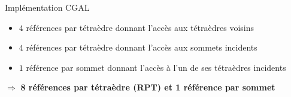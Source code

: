 \documentclass[9pt]{beamer}
\begin{document}
\begin{frame}
\begin{block}{Implémentation CGAL}
\begin{itemize}
\item $4$ références par tétraèdre donnant l'accès aux tétraèdres voisins
\item $4$ références par tétraèdre donnant l'accès aux sommets incidents
\item $1$ référence par sommet donnant l'accès à l'un de ses tétraèdres incidents
\end{itemize}
$\Rightarrow$ \textbf{8 références par tétraèdre (RPT) et 1 référence par sommet}
\end{block}
\end{frame}



%
\end{document}
